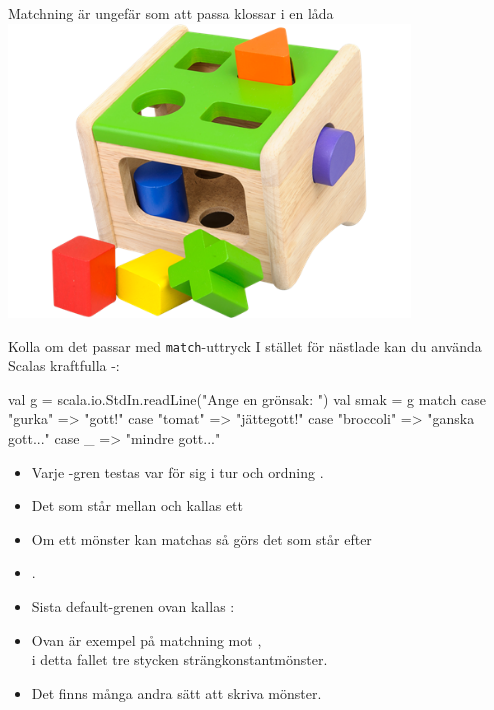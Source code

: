 \ifkompendium\else
\begin{SlideExtra}{Matchning är ungefär som att passa klossar i en låda}
\includegraphics[width=0.8\textwidth]{../img/plocklada.png}
\end{SlideExtra}
\fi


\begin{Slide}{Kolla om det passar med \texttt{match}-uttryck}\SlideFontSmall
I stället för nästlade  kan du använda Scalas kraftfulla -:

\begin{Code}
val g = scala.io.StdIn.readLine("Ange en grönsak: ")
val smak = g match 
  case "gurka"    => "gott!"
  case "tomat"    => "jättegott!"
  case "broccoli" => "ganska gott..."
  case _ => "mindre gott..."
\end{Code}
\begin{itemize}
\pause\item Varje -gren testas var för sig i tur och ordning .
\item Det som står mellan  och \code{=>} kallas ett  
\item Om ett mönster kan matchas så görs det som står efter \code{=>} 
\item {}.  
\item Sista default-grenen ovan kallas : 
\item Ovan är exempel på matchning mot , \\ i detta fallet tre stycken strängkonstantmönster.
\item Det finns många andra sätt att skriva mönster.
\end{itemize}

\end{Slide}


